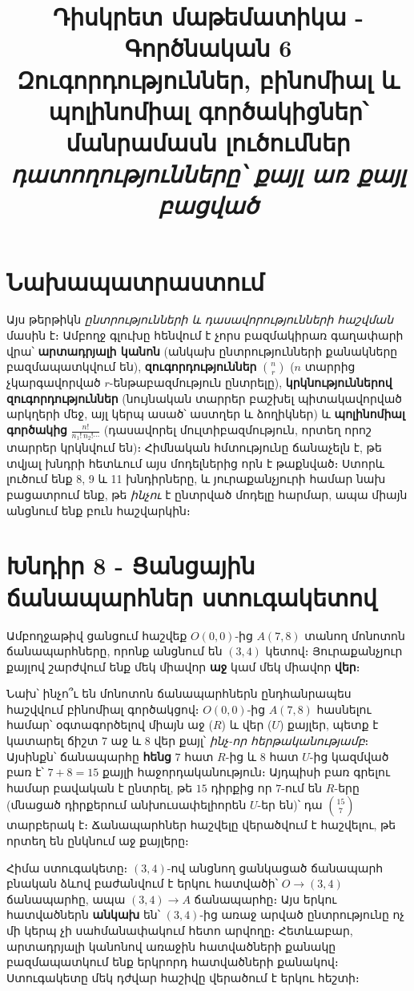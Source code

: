 \documentclass[11pt,a4paper]{article}
\title{\vspace{-1.2cm}\textbf{Դիսկրետ մաթեմատիկա - Գործնական 6}\\[2pt]
\large Զուգորդություններ, բինոմիալ և պոլինոմիալ գործակիցներ՝ մանրամասն լուծումներ\\[2pt]
\normalsize\itshape դատողությունները՝ քայլ առ քայլ բացված}
\author{}
\date{}
\begin{document}
\maketitle
\vspace{-1.0cm}

\section*{Նախապատրաստում}
Այս թերթիկն \emph{ընտրությունների և դասավորությունների հաշվման} մասին է։ Ամբողջ գլուխը հենվում է
չորս բազմակիրառ գաղափարի վրա՝ \textbf{արտադրյալի կանոն} (անկախ ընտրությունների քանակները
բազմապատկվում են), \textbf{զուգորդություններ} $\binom{n}{r}$ ($n$ տարրից չկարգավորված
$r$-ենթաբազմություն ընտրելը), \textbf{կրկնություններով զուգորդություններ} (նույնական տարրեր բաշխել
պիտակավորված արկղերի մեջ, այլ կերպ ասած՝ աստղեր և ձողիկներ) և \textbf{պոլինոմիալ գործակից}
$\frac{n!}{n_1!\,n_2!\cdots}$ (դասավորել մուլտիբազմություն, որտեղ որոշ տարրեր կրկնվում են)։
Հիմնական հմտությունը ճանաչելն է, թե տվյալ խնդրի հետևում այս մոդելներից որն է թաքնված։ Ստորև
լուծում ենք 8, 9 և 11 խնդիրները, և յուրաքանչյուրի համար նախ բացատրում ենք, թե \emph{ինչու} է
ընտրված մոդելը հարմար, ապա միայն անցնում ենք բուն հաշվարկին։

\section*{Խնդիր 8 - Ցանցային ճանապարհներ ստուգակետով}

\begin{problembox}[8]
Ամբողջաթիվ ցանցում հաշվեք $O(0,0)$-ից $A(7,8)$ տանող մոնոտոն ճանապարհները, որոնք անցնում են $(3,4)$
կետով։ Յուրաքանչյուր քայլով շարժվում ենք մեկ միավոր \textbf{աջ} կամ մեկ միավոր \textbf{վեր}։
\end{problembox}

\begin{ideabox}
Նախ՝ ինչո՞ւ են մոնոտոն ճանապարհներն ընդհանրապես հաշվվում բինոմիալ գործակցով։ $O(0,0)$-ից $A(7,8)$
հասնելու համար՝ օգտագործելով միայն աջ ($R$) և վեր ($U$) քայլեր, պետք է կատարել ճիշտ $7$ աջ և $8$ վեր
քայլ՝ \emph{ինչ-որ հերթականությամբ}։ Այսինքն՝ ճանապարհը \textbf{հենց} $7$ հատ $R$-ից և $8$ հատ
$U$-ից կազմված բառ է՝ $7+8=15$ քայլի հաջորդականություն։ Այդպիսի բառ գրելու համար բավական է ընտրել,
թե $15$ դիրքից որ $7$-ում են $R$-երը (մնացած դիրքերում անխուսափելիորեն $U$-եր են)՝ դա
$\binom{15}{7}$ տարբերակ է։ Ճանապարհներ հաշվելը վերածվում է հաշվելու, թե որտեղ են ընկնում աջ
քայլերը։

Հիմա ստուգակետը։ $(3,4)$-ով անցնող ցանկացած ճանապարհ բնական ձևով բաժանվում է երկու հատվածի՝
$O\to(3,4)$ ճանապարհը, ապա $(3,4)\to A$ ճանապարհը։ Այս երկու հատվածներն \textbf{անկախ} են՝
$(3,4)$-ից առաջ արված ընտրությունը ոչ մի կերպ չի սահմանափակում հետո արվողը։ Հետևաբար, արտադրյալի
կանոնով առաջին հատվածների քանակը բազմապատկում ենք երկրորդ հատվածների քանակով։ Ստուգակետը մեկ դժվար
հաշիվը վերածում է երկու հեշտի։
\end{ideabox}
\end{document}
